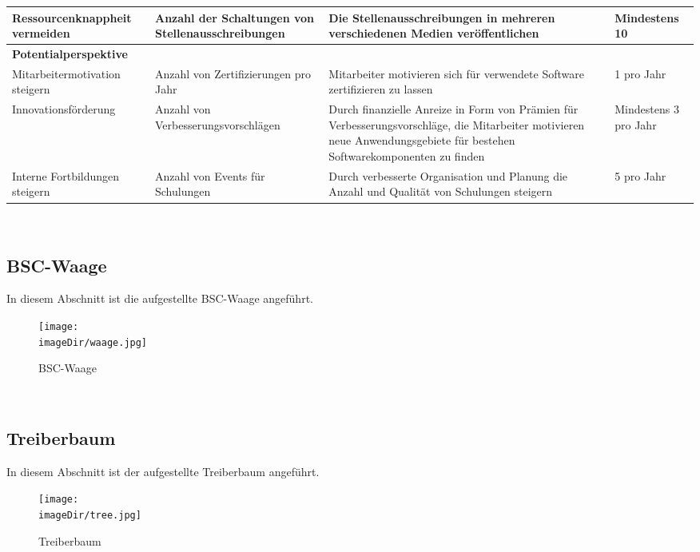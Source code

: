 \begin{tabularx}{\textwidth}{ X | X | X | X }
	Ressourcenknappheit vermeiden &
	Anzahl der Schaltungen von Stellenausschreibungen &
	Die Stellenausschreibungen in mehreren verschiedenen Medien veröffentlichen &
	Mindestens 10 \\ \hline
	
	\multicolumn{4}{p{300pt}}{\textbf{Potentialperspektive}} \\ \hline
	Mitarbeitermotivation steigern &
	Anzahl von Zertifizierungen pro Jahr &
	Mitarbeiter motivieren sich für verwendete Software zertifizieren zu lassen &
	1 pro Jahr \\ \hline
	
	Innovationsförderung &
	Anzahl von Verbesserungsvorschlägen &
	Durch finanzielle Anreize in Form von Prämien für Verbesserungsvorschläge, die Mitarbeiter motivieren neue Anwendungsgebiete für bestehen Softwarekomponenten zu finden &
	Mindestens 3 pro Jahr \\ \hline
	
	Interne Fortbildungen steigern &
	Anzahl von Events für Schulungen &
	Durch verbesserte Organisation und Planung die Anzahl und Qualität von Schulungen steigern &
	5 pro Jahr \\ \hline
	
\end{tabularx}
\egroup
\ \newpage
\subsection{BSC-Waage}
In diesem Abschnitt ist die aufgestellte BSC-Waage angeführt.
\begin{figure}[h]
	\centering
	\texttt{[image: \\imageDir/waage.jpg]}
	\caption{BSC-Waage}
	\label{fig:balanced-bsc}
\end{figure}
\ \newpage
\subsection{Treiberbaum}
In diesem Abschnitt ist der aufgestellte Treiberbaum angeführt.
\begin{figure}[h]
	\centering
	\texttt{[image: \\imageDir/tree.jpg]}
	\caption{Treiberbaum}
	\label{fig:balanced-tree}
\end{figure}
